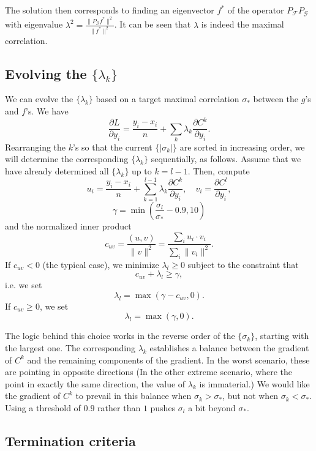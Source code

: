 \documentclass[a4paper,11pt]{article}
\theoremstyle{definition}
\begin{document}
The solution then corresponds to finding an eigenvector $f^*$ of the operator $P_\mathcal{F}P_\mathcal{G}$ with eigenvalue $\lambda^2=\frac{\|P_\mathcal{G}f^*\|^2}{\|f^*\|^2}$. It can be seen that $\lambda$ is indeed the maximal correlation.


\subsection{Evolving the $\{\lambda_k\}$}


We can evolve the $\{\lambda_k\}$ based on a target maximal correlation $\sigma_*$ between the $g$'s and $f$'s. We have
%
$$ \frac{\partial L}{\partial y_i} = \frac{y_i - x_i}{n} +  \sum_k \lambda_k \frac{\partial C^k}{\partial y_i}. $$
%
Rearranging the $k$'s so that the current $\{|\sigma_k|\}$ are sorted in increasing order, we will determine the corresponding $\{\lambda_k\}$ sequentially, as follows. Assume that we have already determined all $\{\lambda_k\}$ up to $k = l-1$. Then, compute
%
$$ u_i = \frac{y_i - x_i}{n} +  \sum_{k=1}^{l-1} \lambda_k \frac{\partial C^k}{\partial y_i} , \quad v_i = \frac{\partial C^l}{\partial y_i},$$ 
%
$$ \gamma = \min \left(\frac{\sigma_l}{\sigma_*}  - 0.9, 10\right) $$
%
and the normalized inner product
%
$$ c_{uv} = \frac{(u, v)}{\|v\|^2} = \frac{\sum_i u_i \cdot v_i}{\sum_i \|v_i\|^2}. $$
%
If $c_{uv} < 0$ (the typical case), we minimize $\lambda_l \ge 0$ subject to the constraint that
%
$$ c_{uv} + \lambda_l \ge \gamma,  $$
%
i.e. we set
%
$$ \lambda_l = \max\left(\gamma-c_{uv}, 0\right). $$ 
%
If $c_{uv} \ge 0$, we set
%
$$ \lambda_l = \max\left(\gamma, 0\right). $$ 
%


The logic behind this choice works in the reverse order of the $\{\sigma_k\}$, starting with the largest one. The corresponding $\lambda_k$ establishes a balance between the gradient of $C^k$ and the remaining components of the gradient.  In the worst scenario, these are pointing in opposite directions (In the other extreme scenario, where the point in exactly the same direction, the value of $\lambda_k$ is immaterial.) We  would like the gradient of $C^k$ to prevail in this balance when $\sigma_k > \sigma_*$, but not when $\sigma_k < \sigma_*$. Using a threshold of $0.9$ rather than $1$ pushes $\sigma_l$ a bit beyond $\sigma_*$.




\subsection{Termination criteria}
\end{document}
